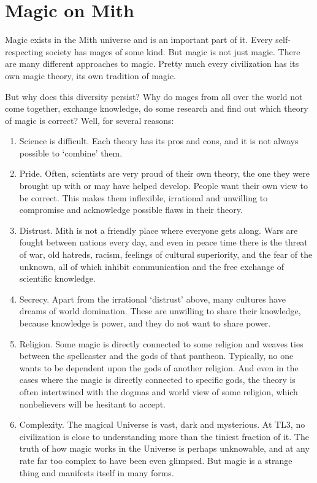 \chapter{Magic on Mith}

Magic exists in the Mith universe and is an important part of it. Every self-respecting society has mages of some kind. But magic is not just magic. There are many different approaches to magic. Pretty much every civilization has its own magic theory, its own tradition of magic. 

But why does this diversity persist? Why do mages from all over the world not come together, exchange knowledge, do some research and find out which theory of magic is correct? Well, for several reasons: 

\begin{enumerate}
	\item Science is difficult. Each theory has its pros and cons, and it is not always possible to `combine' them. 
	\item Pride. Often, scientists are very proud of their own theory, the one they were brought up with or may have helped develop. People want their own view to be correct. This makes them inflexible, irrational and unwilling to compromise and acknowledge possible flaws in their theory. 
	\item Distrust. Mith is not a friendly place where everyone gets along. Wars are fought between nations every day, and even in peace time there is the threat of war, old hatreds, racism, feelings of cultural superiority, and the fear of the unknown, all of which inhibit communication and the free exchange of scientific knowledge. 
	\item Secrecy. Apart from the irrational `distrust' above, many cultures have dreams of world domination. These are unwilling to share their knowledge, because knowledge is power, and they do not want to share power. 
	\item Religion. Some magic is directly connected to some religion and weaves ties between the spellcaster and the gods of that pantheon. Typically, no one wants to be dependent upon the gods of another religion. And even in the cases where the magic is directly connected to specific gods, the theory is often intertwined with the dogmas and world view of some religion, which nonbelievers will be hesitant to accept. 
	\item Complexity. The magical Universe is vast, dark and mysterious. At TL3, no civilization is close to understanding more than the tiniest fraction of it. The truth of how magic works in the Universe is perhaps unknowable, and at any rate far too complex to have been even glimpsed. But magic is a strange thing and manifests itself in many forms. 

\end{enumerate}

